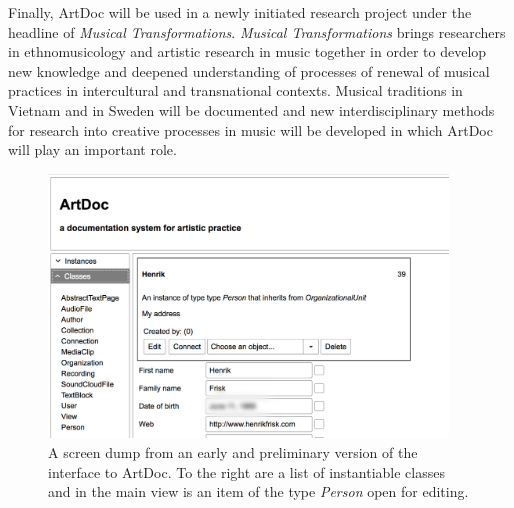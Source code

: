 \documentclass[,a4paper]{llncs}
\begin{document}
Finally, ArtDoc will be used in a newly initiated research project under the headline of \emph{Musical Transformations}. \emph{Musical Transformations} brings researchers in ethnomusicology and artistic research in music together in order to develop new knowledge and deepened understanding of processes of renewal of musical practices in intercultural and transnational contexts. Musical traditions in Vietnam and in Sweden will be documented and new interdisciplinary methods for research into creative processes in music will be developed in which ArtDoc will play an important role.
\begin{figure}
\centering
\includegraphics[height=7cm]{img/screen-dump.png}
\caption{A screen dump from an early and preliminary version of the interface to ArtDoc. To the right are a list of instantiable classes and in the main view is an item of the type \emph{Person} open for editing.}
\label{fig:client}
\end{figure}
\end{document}
